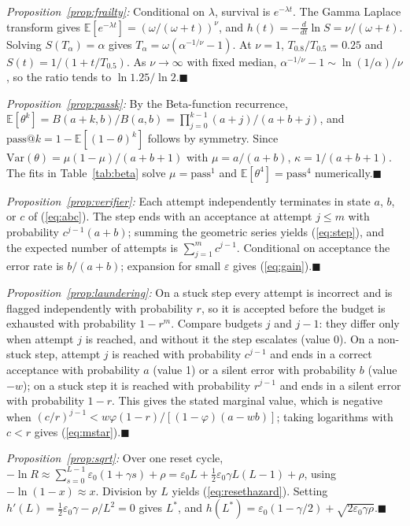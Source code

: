 \documentclass[journal]{IEEEtran}
\makeatletter
\newcommand{\E}{\mathbb{E}}
\newcommand{\passat}[1]{\mathrm{pass@}#1}
\makeatother
\begin{document}
\emph{Proposition~\ref{prop:frailty}:} Conditional on $\lambda$, survival is $e^{-\lambda t}$. The Gamma Laplace transform gives $\E[e^{-\lambda t}]=(\omega/(\omega+t))^\nu$, and $h(t)=-\tfrac{d}{dt}\ln S=\nu/(\omega+t)$. Solving $S(T_\alpha)=\alpha$ gives $T_\alpha=\omega(\alpha^{-1/\nu}-1)$. At $\nu=1$, $T_{0.8}/T_{0.5}=0.25$ and $S(t)=1/(1+t/T_{0.5})$. As $\nu\to\infty$ with fixed median, $\alpha^{-1/\nu}-1\sim\ln(1/\alpha)/\nu$, so the ratio tends to $\ln1.25/\ln2$.\hfill$\blacksquare$

\emph{Proposition~\ref{prop:passk}:} By the Beta-function recurrence, $\E[\theta^k]=B(a+k,b)/B(a,b)=\prod_{j=0}^{k-1}(a+j)/(a+b+j)$, and $\passat{k}=1-\E[(1-\theta)^k]$ follows by symmetry. Since $\mathrm{Var}(\theta)=\mu(1-\mu)/(a+b+1)$ with $\mu=a/(a+b)$, $\kappa=1/(a+b+1)$. The fits in Table~\ref{tab:beta} solve $\mu=\mathrm{pass}^1$ and $\E[\theta^4]=\mathrm{pass}^4$ numerically.\hfill$\blacksquare$

\emph{Proposition~\ref{prop:verifier}:} Each attempt independently terminates in state $a$, $b$, or $c$ of (\ref{eq:abc}). The step ends with an acceptance at attempt $j\le m$ with probability $c^{j-1}(a+b)$; summing the geometric series yields (\ref{eq:step}), and the expected number of attempts is $\sum_{j=1}^{m}c^{j-1}$. Conditional on acceptance the error rate is $b/(a+b)$; expansion for small $\varepsilon$ gives (\ref{eq:gain}).\hfill$\blacksquare$

\emph{Proposition~\ref{prop:laundering}:} On a stuck step every attempt is incorrect and is flagged independently with probability $r$, so it is accepted before the budget is exhausted with probability $1-r^m$. Compare budgets $j$ and $j-1$: they differ only when attempt $j$ is reached, and without it the step escalates (value 0). On a non-stuck step, attempt $j$ is reached with probability $c^{j-1}$ and ends in a correct acceptance with probability $a$ (value 1) or a silent error with probability $b$ (value $-w$); on a stuck step it is reached with probability $r^{j-1}$ and ends in a silent error with probability $1-r$. This gives the stated marginal value, which is negative when $(c/r)^{j-1}<w\varphi(1-r)/[(1-\varphi)(a-wb)]$; taking logarithms with $c<r$ gives (\ref{eq:mstar}).\hfill$\blacksquare$

\emph{Proposition~\ref{prop:sqrt}:} Over one reset cycle, $-\ln R\approx\sum_{s=0}^{L-1}\varepsilon_0(1+\gamma s)+\rho=\varepsilon_0L+\tfrac12\varepsilon_0\gamma L(L-1)+\rho$, using $-\ln(1-x)\approx x$. Division by $L$ yields (\ref{eq:resethazard}). Setting $h'(L)=\tfrac12\varepsilon_0\gamma-\rho/L^2=0$ gives $L^*$, and $h(L^*)=\varepsilon_0(1-\gamma/2)+\sqrt{2\varepsilon_0\gamma\rho}$.\hfill$\blacksquare$
\end{document}
